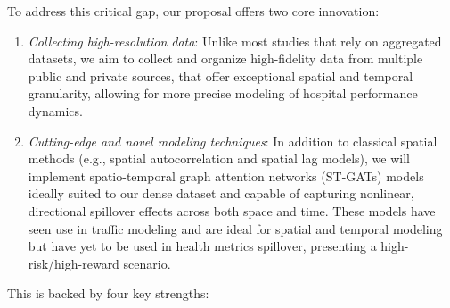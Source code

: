 \documentclass[10pt]{article}
\begin{document}
To address this critical gap, our proposal offers two core innovation:
\begin{enumerate}[itemsep=0pt, parsep=0pt]

	\item \textit{Collecting high-resolution data}: Unlike most studies that rely on aggregated datasets, we aim to collect and organize high-fidelity data from multiple public and private sources, that offer exceptional spatial and temporal granularity, allowing for more precise modeling of hospital performance dynamics.
	\item \textit{Cutting-edge and novel modeling techniques}: In addition to classical spatial methods (e.g., spatial autocorrelation and spatial lag models), we will implement spatio-temporal graph attention networks (ST-GATs)\cite{zhang_spatial-temporal_2019} models ideally suited to our dense dataset and capable of capturing nonlinear, directional spillover effects across both space and time. These models have seen use in traffic modeling and are ideal for spatial and temporal modeling \cite{9146162} but have yet to be used in health metrics spillover, presenting a high-risk/high-reward scenario.
\end{enumerate}
This is backed by four key strengths:
\end{document}
